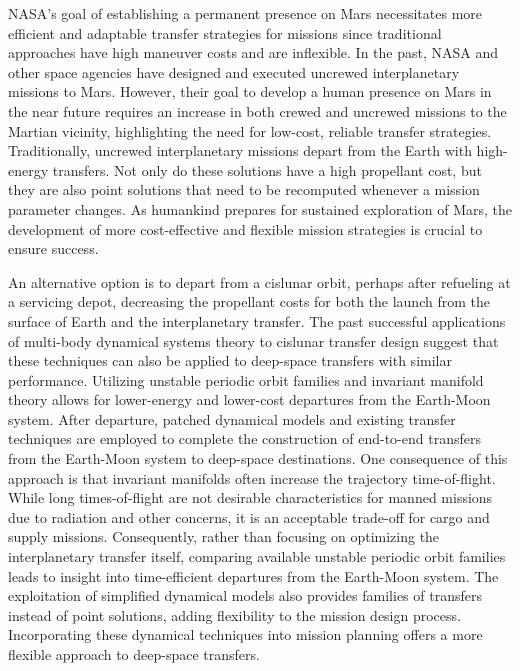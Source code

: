 NASA's goal of establishing a permanent presence on Mars necessitates more efficient and adaptable
transfer strategies for missions since traditional approaches have high maneuver costs and are
inflexible. In the past, NASA and other space agencies have designed and executed uncrewed
interplanetary missions to Mars. However, their goal to develop a human presence on Mars in the
near future requires an increase in both crewed and uncrewed missions to the Martian vicinity,
highlighting the need for low-cost, reliable transfer strategies. Traditionally, uncrewed
interplanetary missions depart from the Earth with high-energy transfers\cite{Drake:2009}. Not only
do these solutions have a high propellant cost, but they are also point solutions that need to be
recomputed whenever a mission parameter changes. As humankind prepares for sustained exploration of
Mars, the development of more cost-effective and flexible mission strategies is crucial to ensure
success.

An alternative option is to depart from a cislunar orbit, perhaps after refueling at a servicing
depot, decreasing the propellant costs for both the launch from the surface of Earth and the
interplanetary transfer. The past successful applications of multi-body dynamical systems theory to
cislunar transfer design suggest that these techniques can also be applied to deep-space transfers
with similar performance. Utilizing unstable periodic orbit families and invariant manifold theory
allows for lower-energy and lower-cost departures from the Earth-Moon system. After departure,
patched dynamical models and existing transfer techniques are employed to complete the construction
of end-to-end transfers from the Earth-Moon system to deep-space destinations. One consequence of
this approach is that invariant manifolds often increase the trajectory time-of-flight. While long
times-of-flight are not desirable characteristics for manned missions due to radiation and other
concerns, it is an acceptable trade-off for cargo and supply missions. Consequently, rather than
focusing on optimizing the interplanetary transfer itself, comparing available unstable periodic
orbit families leads to insight into time-efficient departures from the Earth-Moon system. The
exploitation of simplified dynamical models also provides families of transfers instead of point
solutions, adding flexibility to the mission design process. Incorporating these dynamical
techniques into mission planning offers a more flexible approach to deep-space transfers.

